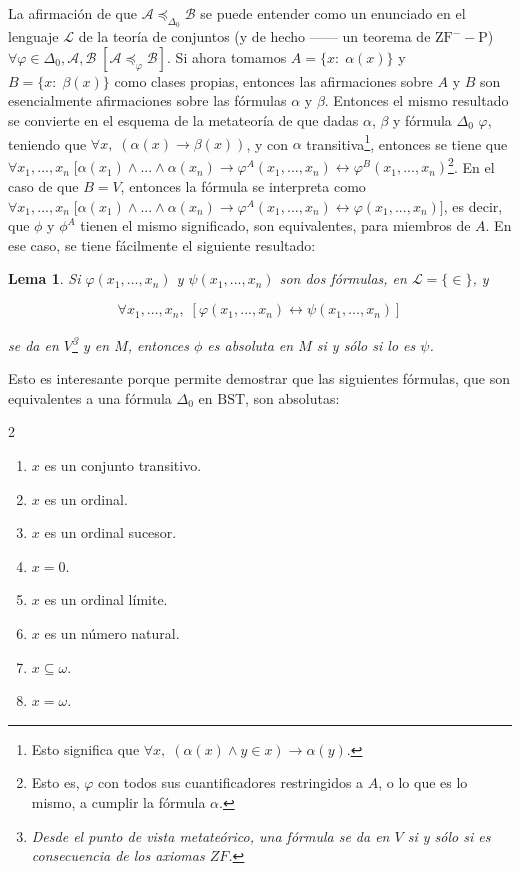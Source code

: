 \documentclass[11pt,a4paper]{book}
\theoremstyle{plain}
\newtheorem{lema}[teorema]{Lema}
\theoremstyle{definition}
\theoremstyle{remark}
\begin{document}
La afirmación de que $\mathcal{A} \preceq_{\Delta_0} \mathcal{B}$ se puede entender como un enunciado en el lenguaje $\mathcal{L}$ de la teoría de conjuntos (y de hecho ---\textcite[p. 97]{Kunen2011}--- un teorema de $\mathrm{ZF^-}-\mathrm{P}$) $\forall \varphi \in \Delta_0, \mathcal{A}, \mathcal{B} \; [ \mathcal{A} \preceq_\varphi \mathcal{B} ]$. Si ahora tomamos $A = \{ x: \; \alpha(x) \}$ y $B = \{ x: \; \beta(x) \}$ como clases propias, entonces las afirmaciones sobre $A$ y $B$ son esencialmente afirmaciones sobre las fórmulas $\alpha$ y $\beta$. Entonces el mismo resultado se convierte en el esquema de la metateoría de que dadas $\alpha$, $\beta$ y fórmula $\Delta_0$ $\varphi$, teniendo que $\forall x, \; (\alpha(x) \rightarrow \beta(x))$, y con $\alpha$ transitiva\footnote{Esto significa que $\forall x, \;(\alpha(x) \wedge y \in x) \rightarrow \alpha(y) $.}, entonces se tiene que $\forall x_1, ..., x_n \; \big[ \alpha(x_1) \wedge ... \wedge \alpha(x_n) \longrightarrow \varphi^A(x_1,...,x_n) \leftrightarrow \varphi^B(x_1,...,x_n)$\footnote{Esto es, $\varphi$ con todos sus cuantificadores restringidos a $A$, o lo que es lo mismo, a cumplir la fórmula $\alpha$.}. En el caso de que $B = V$, entonces la fórmula se interpreta como $\forall x_1, ..., x_n \; \big[ \alpha(x_1) \wedge ... \wedge \alpha(x_n) \longrightarrow \varphi^A(x_1,...,x_n) \leftrightarrow \varphi(x_1,...,x_n) \big]$, es decir, que $\phi$ y $\phi^A$ tienen el mismo significado, son equivalentes, para miembros de $A$. En ese caso, se tiene fácilmente el siguiente resultado:

\begin{lema}
  Si $\varphi(x_1, ..., x_n)$ y $\psi(x_1, ..., x_n)$ son dos fórmulas, en $\mathcal{L} = \{ \in \}$, y 
  
  $$\forall x_1, ..., x_n, \; [\varphi(x_1, ..., x_n) \leftrightarrow \psi(x_1, ..., x_n)]$$
  
  se da en $V$\footnote{Desde el punto de vista metateórico, una fórmula se da en $V$ si y sólo si es consecuencia de los axiomas $ZF$.} y en $M$, entonces $\phi$ es absoluta en $M$ si y sólo si lo es $\psi$.
\end{lema}

Esto es interesante porque permite demostrar que las siguientes fórmulas, que son equivalentes a una fórmula $\Delta_0$ en $\mathrm{BST}$, son absolutas:

\begin{multicols}{2}
\begin{enumerate} 
  \item $x$ es un conjunto transitivo.
  \item $x$ es un ordinal.
  \item $x$ es un ordinal sucesor.
  \item $x=0$.
  \item $x$ es un ordinal límite.
  \item $x$ es un número natural.
  \item $x \subseteq \omega$.
  \item $x = \omega$.
\end{enumerate}
\end{multicols}
\end{document}
